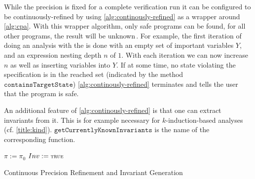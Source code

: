 While the precision is fixed for a complete verification run it can be configured to be continuously-refined by using \autoref{alg:continously-refined}
as a wrapper around \autoref{alg:cpa}. With this wrapper algorithm, only safe programs can be found, for all other programs, the result will be
unknown\,.
For example, the first iteration of doing an analysis with the \InvariantsCPA{} is done with an empty set of important variables $Y$, and an expression
nesting depth $n$ of $1$. With each iteration we can now increase $n$ as well as inserting variables into $Y$. If at some time, no state violating the specification
is in the reached set (indicated by the method $\mathtt{containsTargetState}$) \autoref{alg:continously-refined} terminates and tells the user that the program is safe.

An additional feature of \autoref{alg:continously-refined} is that one can extract invariants from it. This is for example
necessary for $k$-induction-based analyses (cf. \autoref{title:kind}). $\mathtt{getCurrentlyKnownInvariants}$ is the name of the corresponding function.

\begin{algorithm}
\LinesNumbered
{}
   $\pi := \pi_0$\;
   $Inv: = \text{\true{}}$\;

 \caption{Continuous Precision Refinement and Invariant Generation~\cite{Beyer:InvariantsCPA}}
 \label{alg:continously-refined}
\end{algorithm}
